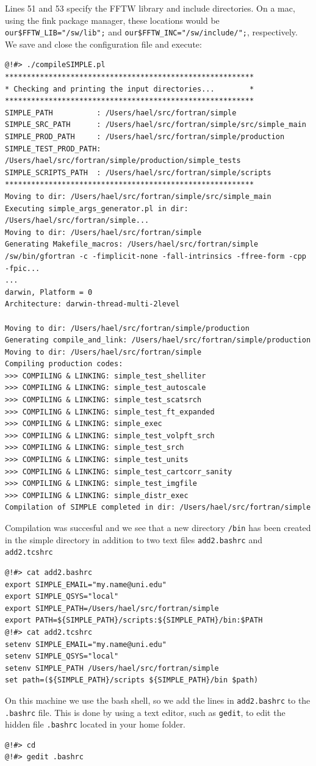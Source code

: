 \documentclass[a4paper,11pt]{article}
\begin{document}
Lines 51 and 53 specify the FFTW library and include directories. On a mac, using the fink package manager, these locations would be \texttt{our\$FFTW\_LIB="/sw/lib";} and \texttt{our\$FFTW\_INC="/sw/include/";}, respectively. We save and close the configuration file and execute:
\begin{verbatim}
@!#> ./compileSIMPLE.pl 
*********************************************************
* Checking and printing the input directories...        *
*********************************************************
SIMPLE_PATH          : /Users/hael/src/fortran/simple
SIMPLE_SRC_PATH      : /Users/hael/src/fortran/simple/src/simple_main
SIMPLE_PROD_PATH     : /Users/hael/src/fortran/simple/production
SIMPLE_TEST_PROD_PATH: /Users/hael/src/fortran/simple/production/simple_tests
SIMPLE_SCRIPTS_PATH  : /Users/hael/src/fortran/simple/scripts
*********************************************************
Moving to dir: /Users/hael/src/fortran/simple/src/simple_main
Executing simple_args_generator.pl in dir: /Users/hael/src/fortran/simple...
Moving to dir: /Users/hael/src/fortran/simple
Generating Makefile_macros: /Users/hael/src/fortran/simple
/sw/bin/gfortran -c -fimplicit-none -fall-intrinsics -ffree-form -cpp -fpic...
...
darwin, Platform = 0
Architecture: darwin-thread-multi-2level

Moving to dir: /Users/hael/src/fortran/simple/production
Generating compile_and_link: /Users/hael/src/fortran/simple/production
Moving to dir: /Users/hael/src/fortran/simple
Compiling production codes:
>>> COMPILING & LINKING: simple_test_shelliter
>>> COMPILING & LINKING: simple_test_autoscale
>>> COMPILING & LINKING: simple_test_scatsrch
>>> COMPILING & LINKING: simple_test_ft_expanded
>>> COMPILING & LINKING: simple_exec
>>> COMPILING & LINKING: simple_test_volpft_srch
>>> COMPILING & LINKING: simple_test_srch
>>> COMPILING & LINKING: simple_test_units
>>> COMPILING & LINKING: simple_test_cartcorr_sanity
>>> COMPILING & LINKING: simple_test_imgfile
>>> COMPILING & LINKING: simple_distr_exec
Compilation of SIMPLE completed in dir: /Users/hael/src/fortran/simple
\end{verbatim}
Compilation was succesful and we see that a new directory \texttt{/bin} has been created in the simple directory in addition to two text files \texttt{add2.bashrc} and \texttt{add2.tcshrc}
\begin{verbatim}
@!#> cat add2.bashrc 
export SIMPLE_EMAIL="my.name@uni.edu"
export SIMPLE_QSYS="local"
export SIMPLE_PATH=/Users/hael/src/fortran/simple
export PATH=${SIMPLE_PATH}/scripts:${SIMPLE_PATH}/bin:$PATH
@!#> cat add2.tcshrc 
setenv SIMPLE_EMAIL="my.name@uni.edu"
setenv SIMPLE_QSYS="local"
setenv SIMPLE_PATH /Users/hael/src/fortran/simple
set path=(${SIMPLE_PATH}/scripts ${SIMPLE_PATH}/bin $path)
\end{verbatim}
On this machine we use the bash shell, so we add the lines in \texttt{add2.bashrc} to the \texttt{.bashrc} file. This is done by using a text editor, such as \texttt{gedit}, to edit the hidden file \texttt{.bashrc} located in your home folder.
\begin{verbatim}
@!#> cd
@!#> gedit .bashrc 
\end{verbatim}
\end{document}
